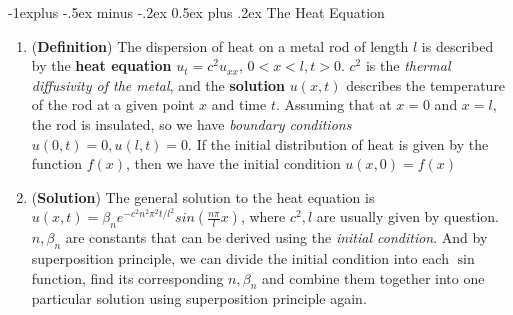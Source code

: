 \documentclass[10pt, landscape]{article}
\makeatletter
\renewcommand{\subsection}{\@startsection{subsection}{2}{0mm}%
                                {-1explus -.5ex minus -.2ex}%
                                {0.5ex plus .2ex}%
                                {\normalfont\normalsize\bfseries}}
\makeatother
\begin{document}
\begin{multicols}{4}
\subsection{The Heat Equation}
\begin{enumerate}
    \item (\textbf{Definition}) The dispersion of heat on a metal rod of length $l$ is described by the \textbf{heat equation} $u_t=c^2u_{xx}$, $0<x<l,t>0$. $c^2$ is the \textit{thermal diffusivity of the metal}, and the \textbf{solution} $u(x,t)$ describes the temperature of the rod at a given point $x$ and time $t$. Assuming that at $x=0$ and $x=l$, the rod is insulated, so we have \textit{boundary conditions} $u(0,t)=0,u(l,t)=0$. If the initial distribution of heat is given by the function $f(x)$, then we have the initial condition $u(x,0)=f(x)$
    \item (\textbf{Solution}) The general solution to the heat equation is $u(x,t)=\beta_ne^{-c^2n^2\pi^2t/l^2}sin(\frac{n\pi}{l}x)$, where $c^2,l$ are usually given by question. $n,\beta_n$ are constants that can be derived using the \textit{initial condition}. And by superposition principle, we can divide the initial condition into each $\sin$ function, find its corresponding $n,\beta_n$ and combine them together into one particular solution using superposition principle again.
\end{enumerate}

\end{multicols}

\end{document}
